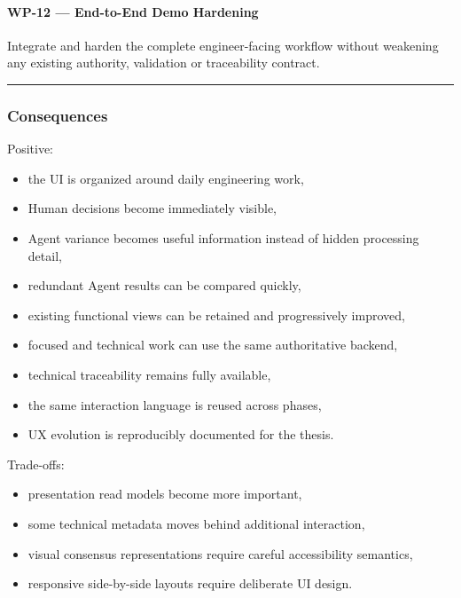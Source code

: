 \hypertarget{wp-12--end-to-end-demo-hardening}{%
\paragraph{WP-12 --- End-to-End Demo Hardening}\label{wp-12--end-to-end-demo-hardening}}

Integrate and harden the complete engineer-facing workflow without weakening any existing authority, validation or traceability contract.

\begin{center}\rule{0.5\linewidth}{0.5pt}\end{center}

\hypertarget{consequences-9}{%
\subsubsection{Consequences}\label{consequences-9}}

Positive:

\begin{itemize}
\tightlist
\item
  the UI is organized around daily engineering work,
\item
  Human decisions become immediately visible,
\item
  Agent variance becomes useful information instead of hidden processing detail,
\item
  redundant Agent results can be compared quickly,
\item
  existing functional views can be retained and progressively improved,
\item
  focused and technical work can use the same authoritative backend,
\item
  technical traceability remains fully available,
\item
  the same interaction language is reused across phases,
\item
  UX evolution is reproducibly documented for the thesis.
\end{itemize}

Trade-offs:

\begin{itemize}
\tightlist
\item
  presentation read models become more important,
\item
  some technical metadata moves behind additional interaction,
\item
  visual consensus representations require careful accessibility semantics,
\item
  responsive side-by-side layouts require deliberate UI design.
\end{itemize}

